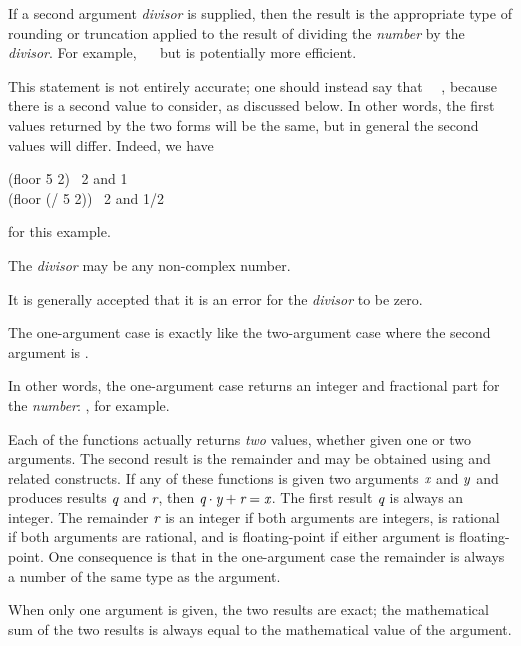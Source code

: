 \begin{defun}[Function]
If a second argument \emph{divisor} is supplied, then the result
is the appropriate type of rounding or truncation applied to the
result of dividing the \emph{number} by the \emph{divisor}.
For example, ~\EQ~ but is potentially more
efficient.
\begin{new}%
This statement is not entirely accurate; one should instead say that
~\EQ~,
because there is a second value to consider, as discussed below.
In other words, the first values returned by the two forms will be the same, but
in general the second values will differ.  Indeed, we have
\begin{lisp}
(floor 5 2) \EV\ 2 \textrm{and} 1 \\
(floor (/ 5 2)) \EV\ 2 \textrm{and} 1/2
\end{lisp}
for this example.
\end{new}
The \emph{divisor} may be any non-complex number.
\begin{new}%
It is generally accepted that it is an error for the \emph{divisor} to be zero.
\end{new}
The one-argument case is exactly like the two-argument case where the second
argument is .

\begin{newer}
In other words, the one-argument case returns an integer and fractional part
for the \emph{number}: , for example.
\end{newer}
Each of the functions actually returns \emph{two} values,
whether given one or two arguments.  The second
result is the remainder and may be obtained using
 and related constructs.
If any of these functions is given two arguments $\emph{x}$ and $\emph{y}$
and produces results $\emph{q}$ and $\emph{r}$, then $\emph{q} \cdot \emph{y}+\emph{r}=\emph{x}$.
The first result $\emph{q}$ is always an integer.
The remainder $\emph{r}$ is an integer if both arguments are integers,
is rational if both arguments are rational,
and is floating-point if either argument is floating-point.
One consequence is that
in the one-argument case the remainder is always a number of the same type
as the argument.

When only one argument is given, the two results are exact;
the mathematical sum of the two results is always equal to the
mathematical value of the argument.

\goodbreak


\end{defun}

